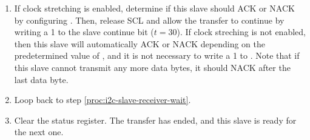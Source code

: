 \begin{enumerate}
	\item If clock stretching is enabled, determine if this slave should ACK or NACK by configuring . Then, release SCL and allow the transfer to continue by writing a 1 to the slave continue bit  ($t = 30$). If clock streching is not enabled, then this slave will automatically ACK or NACK depending on the predetermined value of , and it is not necessary to write a 1 to . Note that if this slave cannot transmit any more data bytes, it should NACK after the last data byte.
	\item Loop back to step \ref{proc:i2c-slave-receiver-wait}.
	\item \label{proc:i2c-slave-receiver-end} Clear the status register. The transfer has ended, and this slave is ready for the next one.
\end{enumerate}


